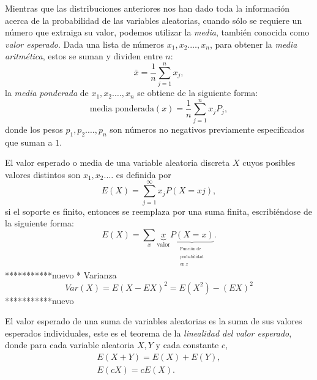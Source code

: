 Mientras que las distribuciones anteriores nos han dado toda la información acerca de la probabilidad de las variables aleatorias, cuando sólo se requiere un número que extraiga su valor, podemos utilizar la \emph{media}, también conocida como \emph{valor esperado}. Dada una lista de números $x_1,x_2.\ldots,x_n$, para obtener la \emph{media aritmética}, estos se suman y dividen entre $n$:
\begin{equation}
\bar{x}=\frac{1}{n}\sum_{j=1}^{n}x_j,
\end{equation}
la \emph{media ponderada} de $x_1,x_2.\ldots,x_n$ se obtiene de la siguiente forma:
\begin{equation}
\text{media ponderada}(x)=\frac{1}{n}\sum_{j=1}^{n}x_jP_j,
\end{equation}
donde los pesos $p_1,p_2.\ldots,p_n$ son números no negativos previamente especificados que suman a $1$.

El valor esperado o media de una variable aleatoria discreta $X$ cuyos posibles valores distintos son $x_1,x_2.\ldots$ es definida por
\begin{equation}
E(X)=\sum_{j=1}^{\infty}x_jP(X=xj),
\end{equation}
si el soporte es finito, entonces se reemplaza por una suma finita, escribiéndose de la siguiente forma:
\begin{equation}
E(X)=\sum_{x}\underbrace{x}_\text{valor}\underbrace{P(X=x)}_{\begin{matrix}^\text{Función de}\\^\text{probabilidad}\\^\text{en $x$}\end{matrix}}.
\end{equation}
***********nuevo * Varianza
\begin{equation}
Var(X)=E{(X-EX)}^2=E(X^2)-{(EX)}^2
\end{equation}
***********nuevo


El valor esperado de una suma de variables aleatorias es la suma de sus valores esperados individuales, este es el teorema de la \emph{linealidad del valor esperado}, donde para cada variable aleatoria $X,Y$ y cada constante $c$,
\begin{equation}
\begin{matrix}
E(X+Y)=E(X)+E(Y),\\
E(cX)=cE(X).
\end{matrix}
\end{equation}
